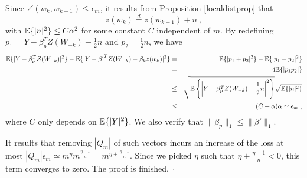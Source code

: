 Since $\angle(w_k,w_{k-1}) \leq \epsilon_m $, 
it results from Proposition \ref{localdistprop} that 
$$z(w_k) \stackrel{d}{=}  z(w_{k-1}) + n~,$$
with ${\mathbb{E}}\{|n|^2\} \leq C\alpha^2$ for some constant $C$ independent of $m$. 
By redefining $p_1 = Y - \beta_p^T Z(W_{-k}) - \frac{1}{2} n$ and 
$p_2 = \frac{1}{2}n$, we have 
\begin{eqnarray*}
{\mathbb{E}} \{ | Y - \beta_p^T Z(W_{-k}) |^2 \} - {\mathbb{E}} \{ | Y - {\beta'}^T Z(W_{-k}) - \beta_k z(w_k) |^2 \} & = & {\mathbb{E}}\{ | p_1 + p_2 |^2 \} - {\mathbb{E}} \{ |p_1 - p_2 |^2 \} \\
&=& 4{\mathbb{E}} \{ |p_1 p_2| \} \\
&\leq& \sqrt{ {\mathbb{E}}\left\{ \left|Y - \beta_p^T Z(W_{-k}) - \frac{1}{2} n \right|^2 \right\} } \sqrt{ {\mathbb{E}} \{ |n|^2 \} } \\
&\leq & (C+\alpha) \alpha \simeq \epsilon_m~,
\end{eqnarray*}
where $C$ only depends on ${\mathbb{E}}\{|Y|^2\}$. We also verify that $\| \beta_p\|_1 \leq \| \beta'\|_1$.

It results that removing $|Q_m|$ of such vectors incurs an increase of the loss at most 
$|Q_m| \epsilon_m \simeq m^\eta m^{\frac{\eta-1}{n} } = m^{\eta + \frac{\eta-1}{n}}$. 
Since we picked $\eta$ such that $\eta + \frac{\eta-1}{n} <0$, this term converges to zero. The proof is finished. $\square$

%
%
%
%
%




